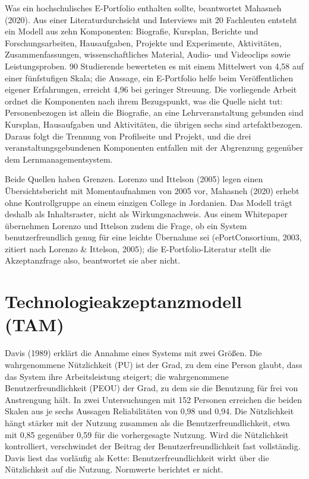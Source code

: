 Was ein hochschulisches E-Portfolio enthalten sollte, beantwortet Mahasneh (2020). Aus einer Literaturdurchsicht und Interviews mit 20 Fachleuten entsteht ein Modell aus zehn Komponenten: Biografie, Kursplan, Berichte und Forschungsarbeiten, Hausaufgaben, Projekte und Experimente, Aktivitäten, Zusammenfassungen, wissenschaftliches Material, Audio- und Videoclips sowie Leistungsproben. 90 Studierende bewerteten es mit einem Mittelwert von 4,58 auf einer fünfstufigen Skala; die Aussage, ein E-Portfolio helfe beim Veröffentlichen eigener Erfahrungen, erreicht 4,96 bei geringer Streuung. Die vorliegende Arbeit ordnet die Komponenten nach ihrem Bezugspunkt, was die Quelle nicht tut: Personenbezogen ist allein die Biografie, an eine Lehrveranstaltung gebunden sind Kursplan, Hausaufgaben und Aktivitäten, die übrigen sechs sind artefaktbezogen. Daraus folgt die Trennung von Profilseite und Projekt, und die drei veranstaltungsgebundenen Komponenten entfallen mit der Abgrenzung gegenüber dem Lernmanagementsystem.

Beide Quellen haben Grenzen. Lorenzo und Ittelson (2005) legen einen Übersichtsbericht mit Momentaufnahmen von 2005 vor, Mahasneh (2020) erhebt ohne Kontrollgruppe an einem einzigen College in Jordanien. Das Modell trägt deshalb als Inhaltsraster, nicht als Wirkungsnachweis. Aus einem Whitepaper übernehmen Lorenzo und Ittelson zudem die Frage, ob ein System benutzerfreundlich genug für eine leichte Übernahme sei (ePortConsortium, 2003, zitiert nach Lorenzo \& Ittelson, 2005); die E-Portfolio-Literatur stellt die Akzeptanzfrage also, beantwortet sie aber nicht.

\section{Technologieakzeptanzmodell (TAM)}
\label{sec:tam}

Davis (1989) erklärt die Annahme eines Systems mit zwei Größen. Die wahrgenommene Nützlichkeit (PU) ist der Grad, zu dem eine Person glaubt, dass das System ihre Arbeitsleistung steigert; die wahrgenommene Benutzerfreundlichkeit (PEOU) der Grad, zu dem sie die Benutzung für frei von Anstrengung hält. In zwei Untersuchungen mit 152 Personen erreichen die beiden Skalen aus je sechs Aussagen Reliabilitäten von 0,98 und 0,94. Die Nützlichkeit hängt stärker mit der Nutzung zusammen als die Benutzerfreundlichkeit, etwa mit 0,85 gegenüber 0,59 für die vorhergesagte Nutzung. Wird die Nützlichkeit kontrolliert, verschwindet der Beitrag der Benutzerfreundlichkeit fast vollständig. Davis liest das vorläufig als Kette: Benutzerfreundlichkeit wirkt über die Nützlichkeit auf die Nutzung. Normwerte berichtet er nicht.

